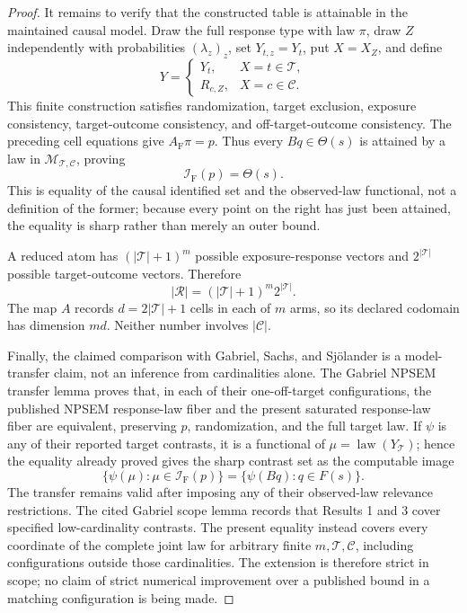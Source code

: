 \documentclass{article}
\begin{document}
\begin{proof}
It remains to verify that the constructed table is attainable in the maintained causal model.  Draw the full response type with law \(\pi\), draw \(Z\) independently with probabilities \((\lambda_z)_z\), set \(Y_{t,z}=Y_t\), put \(X=X_Z\), and define
\[
Y=\begin{cases}
Y_t,&X=t\in\mathcal T,\\
R_{c,Z},&X=c\in\mathcal C.
\end{cases}
\]
This finite construction satisfies randomization, target exclusion, exposure consistency, target-outcome consistency, and off-target-outcome consistency.  The preceding cell equations give \(A_{\mathrm F}\pi=p\).  Thus every \(Bq\in\Theta(s)\) is attained by a law in \(\mathcal M_{\mathcal T,\mathcal C}\), proving
\[
\mathcal I_{\mathrm F}(p)=\Theta(s).
\]
This is equality of the causal identified set and the observed-law functional, not a definition of the former; because every point on the right has just been attained, the equality is sharp rather than merely an outer bound.

A reduced atom has \((|\mathcal T|+1)^m\) possible exposure-response vectors and \(2^{|\mathcal T|}\) possible target-outcome vectors.  Therefore
\[
|\mathcal R|=(|\mathcal T|+1)^m2^{|\mathcal T|}.
\]
The map \(A\) records \(d=2|\mathcal T|+1\) cells in each of \(m\) arms, so its declared codomain has dimension \(md\).  Neither number involves \(|\mathcal C|\).

Finally, the claimed comparison with Gabriel, Sachs, and Sj\"olander is a model-transfer claim, not an inference from cardinalities alone.  The Gabriel NPSEM transfer lemma proves that, in each of their one-off-target configurations, the published NPSEM response-law fiber and the present saturated response-law fiber are equivalent, preserving \(p\), randomization, and the full target law.  If \(\psi\) is any of their reported target contrasts, it is a functional of \(\mu=\operatorname{law}(Y_{\mathcal T})\); hence the equality already proved gives the sharp contrast set as the computable image
\[
\{\psi(\mu):\mu\in\mathcal I_{\mathrm F}(p)\}
=\{\psi(Bq):q\in F(s)\}.
\]
The transfer remains valid after imposing any of their observed-law relevance restrictions.  The cited Gabriel scope lemma records that Results 1 and 3 cover specified low-cardinality contrasts.  The present equality instead covers every coordinate of the complete joint law for arbitrary finite \(m,\mathcal T,\mathcal C\), including configurations outside those cardinalities.  The extension is therefore strict in scope; no claim of strict numerical improvement over a published bound in a matching configuration is being made.
\end{proof}
\end{document}
